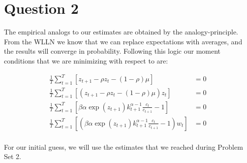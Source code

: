 \documentclass[12pt]{paper}
\newcommand{\brak}[1]{ \left [ #1 \right ] }
\begin{document}
\section{Question 2}

The empirical analogs to our estimates are obtained by the
analogy-principle. From the WLLN we know that we can replace
expectations with averages, and the results will converge in
probability. Following this logic our moment conditions that we are
minimizing with respect to are:

\begin{align*}
  \frac{1}{T} \sum_{t=1}^T \brak{ z_{t+1} - \rho z_t - (1-\rho)\mu} &= 0\\
  \frac{1}{T} \sum_{t=1}^T \brak{ \left( z_{t+1} - \rho z_t - (1-\rho)\mu
  \right)z_t} &= 0\\
  \frac{1}{T} \sum_{t=1}^T \brak{ \beta \alpha \exp(z_{t+1}) k_{t+1}^{\alpha-1}
  \frac{c_t}{c_{t+1}} - 1} &= 0\\
  \frac{1}{T} \sum_{t=1}^T \brak{ \left( \beta \alpha \exp(z_{t+1}) k_{t+1}^{\alpha-1}
  \frac{c_t}{c_{t+1}} - 1 \right) w_t} &= 0\\  
\end{align*}

For our initial guess, we will use the estimates that we reached
during Problem Set 2.
\end{document}
